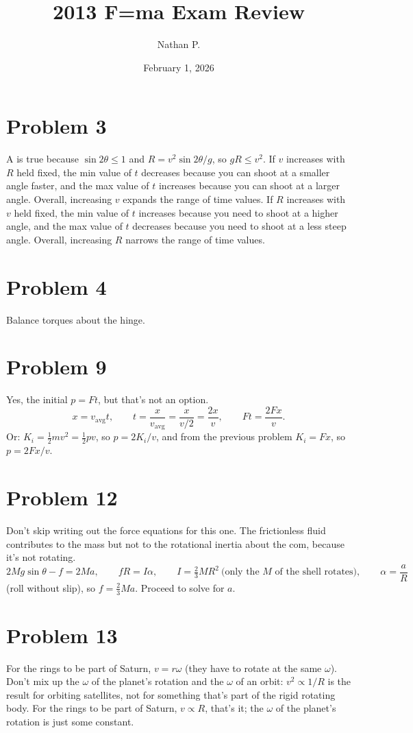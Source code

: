 \documentclass[11pt]{article}
\title{2013 F=ma Exam Review}
\author{Nathan P.}
\date{February 1, 2026}
\begin{document}
\maketitle

\section*{Problem 3}
A is true because $\sin 2\theta\le 1$ and $R=v^2\sin 2\theta/g$, so $gR\le v^2$.
If $v$ increases with $R$ held fixed, the min value of $t$ decreases because you can shoot at a smaller angle faster, and the max value of $t$ increases because you can shoot at a larger angle. Overall, increasing $v$ expands the range of time values.
If $R$ increases with $v$ held fixed, the min value of $t$ increases because you need to shoot at a higher angle, and the max value of $t$ decreases because you need to shoot at a less steep angle. Overall, increasing $R$ narrows the range of time values.

\section*{Problem 4}
Balance torques about the hinge.

\section*{Problem 9}
Yes, the initial $p=Ft$, but that's not an option.
\[
x=v_{\text{avg}}t,\qquad t=\frac{x}{v_{\text{avg}}}=\frac{x}{v/2}=\frac{2x}{v},\qquad Ft=\frac{2Fx}{v}.
\]
Or: $K_i=\tfrac12mv^2=\tfrac12pv$, so $p=2K_i/v$, and from the previous problem $K_i=Fx$, so $p=2Fx/v$.

\section*{Problem 12}
Don't skip writing out the force equations for this one. The frictionless fluid contributes to the mass but not to the rotational inertia about the com, because it's not rotating.
\[
2Mg\sin\theta-f=2Ma,\qquad fR=I\alpha,\qquad I=\tfrac23MR^2\ \text{(only the $M$ of the shell rotates)},\qquad \alpha=\frac aR
\]
(roll without slip), so $f=\tfrac23Ma$. Proceed to solve for $a$.

\section*{Problem 13}
For the rings to be part of Saturn, $v=r\omega$ (they have to rotate at the same $\omega$). Don't mix up the $\omega$ of the planet's rotation and the $\omega$ of an orbit: $v^2\propto 1/R$ is the result for orbiting satellites, not for something that's part of the rigid rotating body. For the rings to be part of Saturn, $v\propto R$, that's it; the $\omega$ of the planet's rotation is just some constant.
\end{document}

